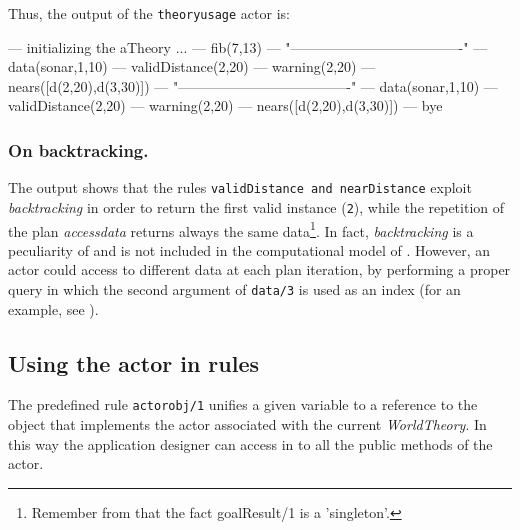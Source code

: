 Thus, the output of the \texttt{theoryusage} actor is:

\begin{javacode}
--- initializing the aTheory ...
--- fib(7,13)
---  "-------------------------------------" 
--- data(sonar,1,10)
--- validDistance(2,20)
--- warning(2,20)
--- nears([d(2,20),d(3,30)])
---  "-------------------------------------" 
--- data(sonar,1,10)
--- validDistance(2,20)
--- warning(2,20)
--- nears([d(2,20),d(3,30)])
--- bye
\end{javacode}

\subsubsection{On backtracking.}
The output shows that the rules \texttt{validDistance and nearDistance} exploit \textit{backtracking} in order to return the first valid instance (\texttt{2}), while the repetition of the plan \textit{accessdata} returns always the same data\footnote{Remember from  that the fact goalResult/1 is a 'singleton'.}. In fact, \textit{backtracking} is a peculiarity of \prolog{} and is not included in the computational model of \qa{}. However, an actor could access to different data at each plan iteration, by performing a proper query in which  the second argument of \texttt{data/3} is used as an index (for an example, see ).

\subsection{Using the actor in \prolog{} rules }


The predefined rule \texttt{actorobj/1} unifies a given variable to a reference to the \java{} object that implements the actor associated with the current  \textit{WorldTheory}. In this way the application designer can access in \prolog{} to all the public methods of the actor. 



